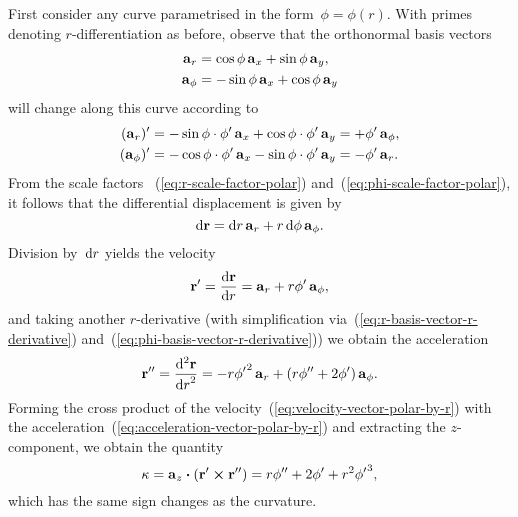 First consider any curve parametrised in the form~$\phi = \phi (r)$.
With primes denoting $r$-differentiation as before,
observe that the orthonormal basis vectors
\begin{align}
  \mathop{}\!\boldsymbol{\mathbf{a}}_{r} &= \cos\phi \mathop{}\!\boldsymbol{\mathbf{a}}_{x} + \sin\phi \mathop{}\!\boldsymbol{\mathbf{a}}_{y},
    \label{eq:r-basis-vector} \\
  \mathop{}\!\boldsymbol{\mathbf{a}}_{\phi} &= -\sin\phi \mathop{}\!\boldsymbol{\mathbf{a}}_{x} + \cos\phi \mathop{}\!\boldsymbol{\mathbf{a}}_{y}
    \label{eq:phi-basis-vector}
\end{align}
will change along this curve according to
\begin{align}
  (\basisvec{r})'
  &= -\sin\phi \cdot \phi' \basisvec{x} + \cos\phi \cdot \phi' \basisvec{y}
  = +\phi' \basisvec{\phi},
    \label{eq:r-basis-vector-r-derivative} \\
  (\basisvec{\phi})'
  &= -\cos\phi \cdot \phi' \basisvec{x} - \sin\phi \cdot \phi' \basisvec{y}
  = -\phi' \basisvec{r}.
    \label{eq:phi-basis-vector-r-derivative}
\end{align}
From the scale factors~%
  (\ref{eq:r-scale-factor-polar}) and~(\ref{eq:phi-scale-factor-polar}),
it follows that the differential displacement is given by
\begin{equation}
  \mathop{}\!\mathrm{d}\boldsymbol{\mathbf{r}} = \mathop{}\!\mathrm{d} r \mathop{}\!\boldsymbol{\mathbf{a}}_{r} + r \mathop{}\!\mathrm{d}\phi \mathop{}\!\boldsymbol{\mathbf{a}}_{\phi}.
  \label{eq:differential-displacement-polar}
\end{equation}
Division by~$\mathop{}\!\mathrm{d} r$ yields the velocity
\begin{equation}
  \positionvec' = \tder{\positionvec}{r} =
  \basisvec{r} + r \phi' \basisvec{\phi},
  \label{eq:velocity-vector-polar-by-r}
\end{equation}
and taking another $r$-derivative
(with simplification via~(\ref{eq:r-basis-vector-r-derivative})
and~(\ref{eq:phi-basis-vector-r-derivative}))
we obtain the acceleration
\begin{equation}
  \positionvec'' = \tder[2]{\positionvec}{r} =
  -r {\phi'}^2 \basisvec{r}
    +
  \roundbr*{r \phi'' + 2 \phi'} \basisvec{\phi}.
  \label{eq:acceleration-vector-polar-by-r}
\end{equation}
Forming the cross product of
the velocity~(\ref{eq:velocity-vector-polar-by-r})
with the acceleration~(\ref{eq:acceleration-vector-polar-by-r})
and extracting the $z$-component,
we obtain the quantity
\begin{equation}
  \kappa =
  \mathop{}\!\boldsymbol{\mathbf{a}}_{z} \boldsymbol{\cdot} (\boldsymbol{\mathbf{r}}' \boldsymbol{\times} \boldsymbol{\mathbf{r}}'') =
  r \phi'' + 2 \phi' + r^2 {\phi'}^3,
  \label{eq:kappa-polar-by-r}
\end{equation}
which has the same sign changes as the curvature.

